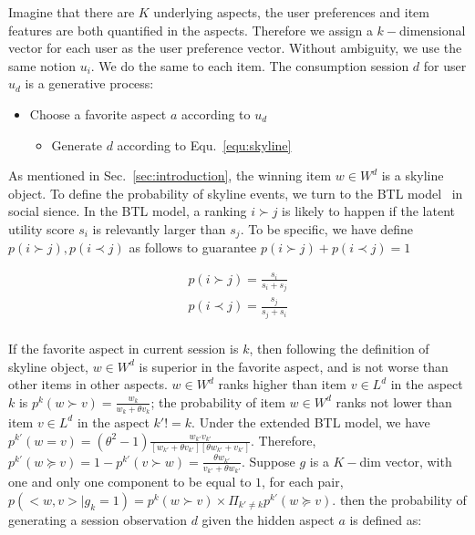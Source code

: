 \documentclass[sigconf]{acmart}
\begin{document}
Imagine that there are $K$ underlying aspects, the user preferences and item features are both quantified in the aspects. Therefore we assign a $k-$dimensional vector for each user as the user preference vector. Without ambiguity, we use the same notion $u_i$. We do the same to each item. The consumption session $d$ for user $u_d$ is a generative process:


\begin{itemize}
	\item Choose a favorite aspect $a$ according to $u_d$
	
	\begin{itemize}
		\item Generate $d$ according to Equ.~\ref{equ:skyline}  
	\end{itemize}
\end{itemize}
  
As mentioned in Sec.~\ref{sec:introduction}, the winning item $w\in W^d$ is a skyline object. To define the probability of skyline events, we turn to the BTL model~\cite{Hunter2004MM} in social sience. In the BTL model, a ranking $i \succ j$ is likely to happen if the latent utility score $s_i$ is relevantly larger than $s_j$. To be specific, we have define $p(i \succ j), p(i \prec j)$ as follows to guarantee $p(i \succ j)+ p(i \prec j) =1$


\begin{align*}
	p(i \succ j)=\frac{s_i}{s_i+ s_j} \\
	p(i \prec j)=\frac{s_j}{s_j+ s_i} \\
\end{align*}
  
If the favorite aspect in current session is $k$, then following the definition of skyline object, $w\in W^d$ is superior in the favorite aspect,  and is not worse than other items in other aspects. $w\in W^d$ ranks higher than item $v\in L^d$ in the aspect $k$ is $p^k(w \succ v)=\frac{w_k}{w_k+\theta v_k}$; the probability of item $w\in W^d$ ranks not lower than item $v\in L^d$ in the aspect $k'!=k$. Under the extended BTL model, we have$p^{k'}(w = v)=(\theta^2-1)\frac{w_{k'}v_{k'}}{[w_{k'}+\theta v_{k'}][\theta w_{k'}+ v_{k'}]}$. Therefore, $p^{k'}(w \succeq v)=1- p^{k'} (v \succ w) = \frac{\theta w_{k'}}{v_{k'}+\theta w_{k'}}$. Suppose $g$ is a $K-$dim vector, with one and only one component to be equal to $1$, for each pair, $p(<w,v>|g_k=1) = p^k(w\succ v) \times \Pi_{k'\neq k} p^{k'}(w \succeq v)$. then the probability of generating a session observation $d$ given the hidden aspect $a$ is defined as:  
\end{document}
